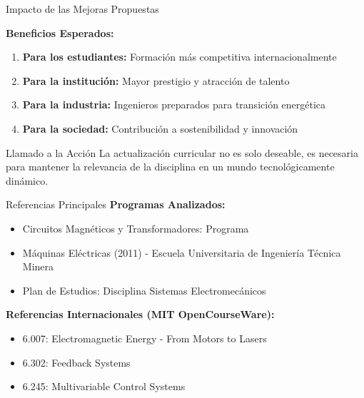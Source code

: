 \documentclass[aspectratio=43]{beamer}
\begin{document}
  \begin{frame}{Impacto de las Mejoras Propuestas}
  
  \textbf{Beneficios Esperados:}
  \begin{enumerate}
  \item \textbf{Para los estudiantes:} Formación más competitiva internacionalmente
  \item \textbf{Para la institución:} Mayor prestigio y atracción de talento
  \item \textbf{Para la industria:} Ingenieros preparados para transición energética
  \item \textbf{Para la sociedad:} Contribución a sostenibilidad y innovación
  \end{enumerate}
  
  \vspace{0.5cm}
  
  \begin{exampleblock}{Llamado a la Acción}
  La actualización curricular no es solo deseable, es necesaria para mantener la relevancia de la disciplina en un mundo tecnológicamente dinámico.
  \end{exampleblock}
  
  \end{frame}
  
  \begin{frame}{Referencias Principales}
  \small
  \textbf{Programas Analizados:}
  \begin{itemize}
  \item Circuitos Magnéticos y Transformadores: Programa
  \item Máquinas Eléctricas (2011) - Escuela Universitaria de Ingeniería Técnica Minera
  \item Plan de Estudios: Disciplina Sistemas Electromecánicos
  \end{itemize}
  
  \vspace{0.3cm}
  
  \textbf{Referencias Internacionales (MIT OpenCourseWare):}
  \begin{itemize}
  \item 6.007: Electromagnetic Energy - From Motors to Lasers
  \item 6.302: Feedback Systems
  \item 6.245: Multivariable Control Systems
  \end{itemize}
  
  \end{frame}
  
\end{document}
